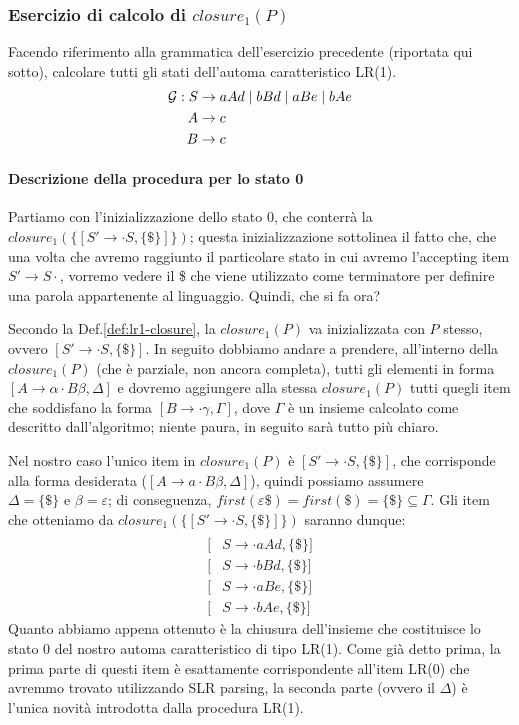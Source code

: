 \documentclass[class=book, crop=false, oneside, 12pt]{standalone}
\begin{document}
\subsubsection{Esercizio di calcolo di \(closure_1(P)\)}
Facendo riferimento alla grammatica dell'esercizio precedente (riportata qui sotto), calcolare tutti gli stati dell'automa caratteristico LR(1).
\begin{align}
    \label{eq:ex3-slr1-grammarr}
    \mathcal{G}: S &\to aAd \mid bBd \mid aBe \mid bAe \\
    A &\to c \nonumber \\ \notag
    B &\to c \notag
\end{align}
\paragraph{Descrizione della procedura per lo stato 0}
Partiamo con l'inizializzazione dello stato \(0\), che conterrà la \(closure_1(\{[S' \to \cdot S, \{\$\}]\})\); questa inizializzazione sottolinea il fatto che, che una volta che avremo raggiunto il particolare stato in cui avremo l'accepting item \(S' \to S\cdot \), vorremo vedere il \$ che viene utilizzato come terminatore per definire una parola appartenente al linguaggio. Quindi, che si fa ora?

Secondo la Def.\ref{def:lr1-closure}, la \(closure_1(P)\) va inizializzata con \(P\) stesso, ovvero \([S' \to \cdot S, \{\$\}]\).
In seguito dobbiamo andare a prendere, all'interno della \(closure_1(P)\) (che è parziale, non ancora completa), tutti gli elementi in forma \([A \rightarrow \alpha \cdot B \beta, \Delta]\) e dovremo aggiungere alla stessa \(closure_1(P)\) tutti quegli item che soddisfano la forma \([B \rightarrow \cdot \gamma, \Gamma]\), dove \(\Gamma\) è un insieme calcolato come descritto dall'algoritmo; niente paura, in seguito sarà tutto più chiaro.

Nel nostro caso l'unico item in \(closure_1(P)\) è \([S' \to \cdot S, \{\$\}]\), che corrisponde alla forma desiderata (\([A \to a \cdot B\beta, \Delta]\)), quindi possiamo assumere \(\Delta = \{\$\} \textrm{ e } \beta = \varepsilon\); di conseguenza, \(first(\varepsilon \$) = first(\$) = \{\$\} \subseteq \Gamma\). Gli item che otteniamo da \(closure_1(\{[S' \to \cdot S, \{\$\}]\})\) saranno dunque:
\begin{align*}
    [&S' \to \cdot S, \{\$\}] \\
    [&S \to \cdot aAd, \{\$\}] \\
	[&S \to \cdot bBd, \{\$\}] \\
	[&S \to \cdot aBe, \{\$\}] \\
	[&S \to \cdot bAe, \{\$\}]
\end{align*}
Quanto abbiamo appena ottenuto è la chiusura dell'insieme che costituisce lo stato 0 del nostro automa caratteristico di tipo LR(1).
Come già detto prima, la prima parte di questi item è esattamente corrispondente all'item LR(0) che avremmo trovato utilizzando SLR parsing, la seconda parte (ovvero il \(\Delta\)) è l'unica novità introdotta dalla procedura LR(1).
\end{document}
